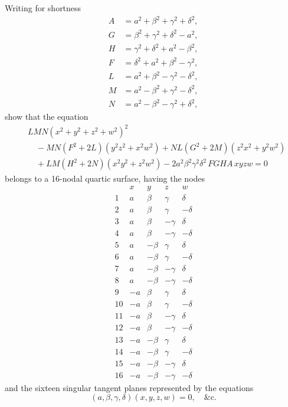 \documentclass[11pt,a4paper]{book}
\begin{document}
Writing for shortness
\[
\begin{aligned}
A &= a^2+\beta^2+\gamma^2+\delta^2, \\
G &= \beta^2+\gamma^2+\delta^2-a^2, \\
H &= \gamma^2+\delta^2+a^2-\beta^2, \\
F &= \delta^2+a^2+\beta^2-\gamma^2, \\
L &= a^2+\beta^2-\gamma^2-\delta^2, \\
M &= a^2-\beta^2+\gamma^2-\delta^2, \\
N &= a^2-\beta^2-\gamma^2+\delta^2,
\end{aligned}
\]
show that the equation
\[
\begin{aligned}
&LMN(x^2+y^2+z^2+w^2)^2 \\
&\quad - MN(F^2+2L)(y^2z^2+x^2w^2) + NL(G^2+2M)(z^2x^2+y^2w^2) \\
&\quad + LM(H^2+2N)(x^2y^2+z^2w^2) - 2a^2\beta^2\gamma^2\delta^2\, FGHA\, xyzw = 0
\end{aligned}
\]
belongs to a 16-nodal quartic surface, having the nodes
\[
\begin{array}{c|cccc}
& x & y & z & w \\ \hline
1 & a & \beta & \gamma & \delta \\
2 & a & \beta & \gamma & -\delta \\
3 & a & \beta & -\gamma & \delta \\
4 & a & \beta & -\gamma & -\delta \\
5 & a & -\beta & \gamma & \delta \\
6 & a & -\beta & \gamma & -\delta \\
7 & a & -\beta & -\gamma & \delta \\
8 & a & -\beta & -\gamma & -\delta \\
9 & -a & \beta & \gamma & \delta \\
10 & -a & \beta & \gamma & -\delta \\
11 & -a & \beta & -\gamma & \delta \\
12 & -a & \beta & -\gamma & -\delta \\
13 & -a & -\beta & \gamma & \delta \\
14 & -a & -\beta & \gamma & -\delta \\
15 & -a & -\beta & -\gamma & \delta \\
16 & -a & -\beta & -\gamma & -\delta
\end{array}
\]
and the sixteen singular tangent planes represented by the equations
\[
(a,\beta,\gamma,\delta)(x,y,z,w) = 0, \quad \&\text{c.}
\]
\end{document}
